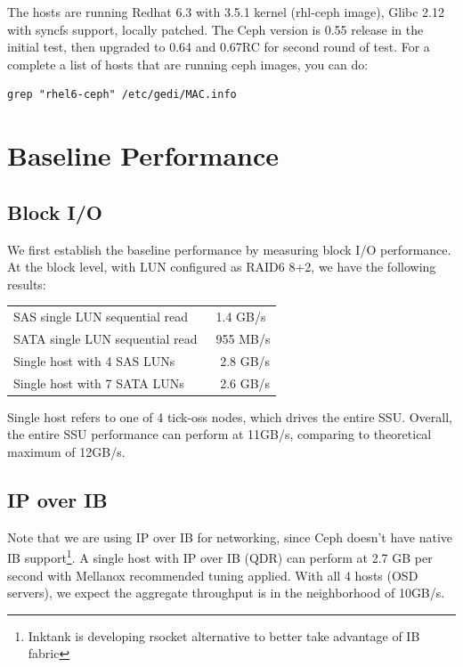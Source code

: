 \documentclass{article}
\begin{document}
The hosts are running Redhat 6.3 with 3.5.1 kernel (rhl-ceph image), Glibc 2.12
with syncfs support, locally patched. The Ceph version is 0.55 release in the
initial test, then upgraded to 0.64 and 0.67RC for second round of test. For a
complete a list of hosts that are running ceph images, you can do:

\begin{Verbatim}
grep "rhel6-ceph" /etc/gedi/MAC.info
\end{Verbatim}


\section{Baseline Performance}


\subsection*{Block I/O}
We first establish the baseline performance by measuring block I/O performance.
At the block level, with LUN configured as RAID6 8+2, we have the following
results:

\begin{table}[htb]
\centering
\begin{tabular}{ll}
    \toprule
    SAS single LUN sequential read & ~1.4 GB/s \\
    SATA single LUN sequential read & ~955 MB/s \\[0.5em]
    Single host with 4 SAS LUNs & ~ 2.8 GB/s \\
    Single host with 7 SATA LUNs & ~ 2.6 GB/s \\
    \bottomrule
\end{tabular}

\end{table}

Single host refers to one of 4 tick-oss nodes, which drives the entire SSU.
Overall, the entire SSU performance can perform at 11GB/s, comparing to
theoretical maximum of 12GB/s.


\subsection*{IP over IB}

Note that we are using IP over IB for networking, since Ceph doesn't have
native IB support\footnote{Inktank is developing rsocket alternative to better take
advantage of IB fabric}.
A single host with IP over IB (QDR) can perform at 2.7 GB per second with
Mellanox recommended tuning applied. With all 4 hosts (OSD servers), we expect
the aggregate throughput is in the neighborhood of 10GB/s.
\end{document}

